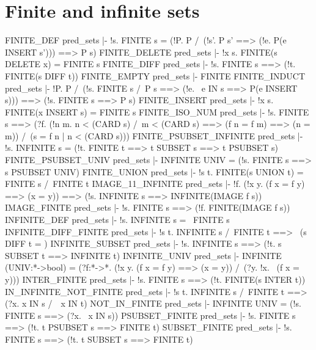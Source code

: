 \section{Finite and infinite sets}
\THEOREM FINITE\_DEF pred\_sets
|- !s.
    FINITE s = (!P. P{} /\ (!s'. P s' ==> (!e. P(e INSERT s'))) ==> P s)
\ENDTHEOREM
\THEOREM FINITE\_DELETE pred\_sets
|- !x s. FINITE(s DELETE x) = FINITE s
\ENDTHEOREM
\THEOREM FINITE\_DIFF pred\_sets
|- !s. FINITE s ==> (!t. FINITE(s DIFF t))
\ENDTHEOREM
\THEOREM FINITE\_EMPTY pred\_sets
|- FINITE{}
\ENDTHEOREM
\THEOREM FINITE\_INDUCT pred\_sets
|- !P.
    P{} /\ (!s. FINITE s /\ P s ==> (!e. ~e IN s ==> P(e INSERT s))) ==>
    (!s. FINITE s ==> P s)
\ENDTHEOREM
\THEOREM FINITE\_INSERT pred\_sets
|- !x s. FINITE(x INSERT s) = FINITE s
\ENDTHEOREM
\THEOREM FINITE\_ISO\_NUM pred\_sets
|- !s.
    FINITE s ==>
    (?f.
      (!n m. n < (CARD s) /\ m < (CARD s) ==> (f n = f m) ==> (n = m)) /\
      (s = {f n | n < (CARD s)}))
\ENDTHEOREM
\THEOREM FINITE\_PSUBSET\_INFINITE pred\_sets
|- !s. INFINITE s = (!t. FINITE t ==> t SUBSET s ==> t PSUBSET s)
\ENDTHEOREM
\THEOREM FINITE\_PSUBSET\_UNIV pred\_sets
|- INFINITE UNIV = (!s. FINITE s ==> s PSUBSET UNIV)
\ENDTHEOREM
\THEOREM FINITE\_UNION pred\_sets
|- !s t. FINITE(s UNION t) = FINITE s /\ FINITE t
\ENDTHEOREM
\THEOREM IMAGE\_11\_INFINITE pred\_sets
|- !f.
    (!x y. (f x = f y) ==> (x = y)) ==>
    (!s. INFINITE s ==> INFINITE(IMAGE f s))
\ENDTHEOREM
\THEOREM IMAGE\_FINITE pred\_sets
|- !s. FINITE s ==> (!f. FINITE(IMAGE f s))
\ENDTHEOREM
\THEOREM INFINITE\_DEF pred\_sets
|- !s. INFINITE s = ~FINITE s
\ENDTHEOREM
\THEOREM INFINITE\_DIFF\_FINITE pred\_sets
|- !s t. INFINITE s /\ FINITE t ==> ~(s DIFF t = {})
\ENDTHEOREM
\THEOREM INFINITE\_SUBSET pred\_sets
|- !s. INFINITE s ==> (!t. s SUBSET t ==> INFINITE t)
\ENDTHEOREM
\THEOREM INFINITE\_UNIV pred\_sets
|- INFINITE (UNIV:*->bool) =
   (?f:*->*. (!x y. (f x = f y) ==> (x = y)) /\ (?y. !x. ~(f x = y)))
\ENDTHEOREM
\THEOREM INTER\_FINITE pred\_sets
|- !s. FINITE s ==> (!t. FINITE(s INTER t))
\ENDTHEOREM
\THEOREM IN\_INFINITE\_NOT\_FINITE pred\_sets
|- !s t. INFINITE s /\ FINITE t ==> (?x. x IN s /\ ~x IN t)
\ENDTHEOREM
\THEOREM NOT\_IN\_FINITE pred\_sets
|- INFINITE UNIV = (!s. FINITE s ==> (?x. ~x IN s))
\ENDTHEOREM
\THEOREM PSUBSET\_FINITE pred\_sets
|- !s. FINITE s ==> (!t. t PSUBSET s ==> FINITE t)
\ENDTHEOREM
\THEOREM SUBSET\_FINITE pred\_sets
|- !s. FINITE s ==> (!t. t SUBSET s ==> FINITE t)
\ENDTHEOREM

